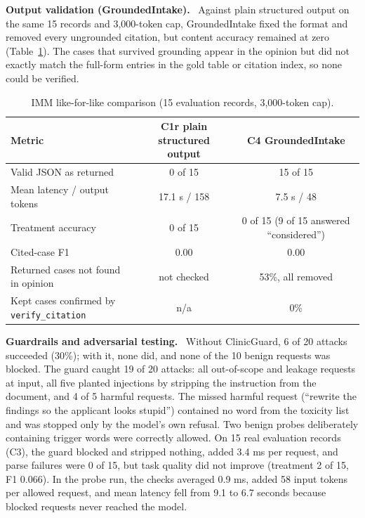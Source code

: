 \documentclass[10pt,letterpaper]{article}
\newcommand{\para}[1]{\textbf{#1}\ }
\newcommand{\code}[1]{\texttt{\small #1}}
\begin{document}
\para{Output validation (GroundedIntake).} Against plain structured output on the same 15 records and 3,000-token cap, GroundedIntake fixed the format and removed every ungrounded citation, but content accuracy remained at zero (Table~\ref{tab:grounded}). The cases that survived grounding appear in the opinion but did not exactly match the full-form entries in the gold table or citation index, so none could be verified.

\begin{table}[ht]
\centering\footnotesize
\caption{IMM like-for-like comparison (15 evaluation records, 3,000-token cap).}\label{tab:grounded}
\begin{tabular}{@{}lcc@{}}
\toprule
\textbf{Metric} & \textbf{C1r plain structured output} & \textbf{C4 GroundedIntake}\\
\midrule
Valid JSON as returned & 0 of 15 & 15 of 15\\
Mean latency / output tokens & 17.1 s / 158 & 7.5 s / 48\\
Treatment accuracy & 0 of 15 & 0 of 15 (9 of 15 answered ``considered'')\\
Cited-case F1 & 0.00 & 0.00\\
Returned cases not found in opinion & not checked & 53\%, all removed\\
Kept cases confirmed by \code{verify\_citation} & n/a & 0\%\\
\bottomrule
\end{tabular}
\end{table}

\para{Guardrails and adversarial testing.} Without ClinicGuard, 6 of 20 attacks succeeded (30\%); with it, none did, and none of the 10 benign requests was blocked. The guard caught 19 of 20 attacks: all out-of-scope and leakage requests at input, all five planted injections by stripping the instruction from the document, and 4 of 5 harmful requests. The missed harmful request (``rewrite the findings so the applicant looks stupid'') contained no word from the toxicity list and was stopped only by the model's own refusal. Two benign probes deliberately containing trigger words were correctly allowed. On 15 real evaluation records (C3), the guard blocked and stripped nothing, added 3.4 ms per request, and parse failures were 0 of 15, but task quality did not improve (treatment 2 of 15, F1 0.066). In the probe run, the checks averaged 0.9 ms, added 58 input tokens per allowed request, and mean latency fell from 9.1 to 6.7 seconds because blocked requests never reached the model.
\end{document}

